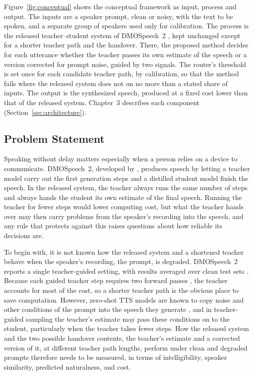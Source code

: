Figure~\ref{fig:conceptual} shows the conceptual framework as input, process and output. The inputs are a speaker prompt, clean or noisy, with the text to be spoken, and a separate group of speakers used only for calibration. The process is the released teacher--student system of DMOSpeech~2 \parencite{li2025dmospeech2}, kept unchanged except for a shorter teacher path and the handover. There, the proposed method decides for each utterance whether the teacher passes its own estimate of the speech or a version corrected for prompt noise, guided by two signals. The router's threshold is set once for each candidate teacher path, by calibration, so that the method fails where the released system does not on no more than a stated share of inputs. The output is the synthesized speech, produced at a fixed cost lower than that of the released system. Chapter~3 describes each component (Section~\ref{sec:architecture}).



\subsection{Problem Statement}
\label{sec:problem}

Speaking without delay matters especially when a person relies on a device to communicate. DMOSpeech~2, developed by \textcite{li2025dmospeech2}, produces speech by letting a teacher model carry out the first generation steps and a distilled student model finish the speech. In the released system, the teacher always runs the same number of steps and always hands the student its own estimate of the final speech. Running the teacher for fewer steps would lower computing cost, but what the teacher hands over may then carry problems from the speaker's recording into the speech, and any rule that protects against this raises questions about how reliable its decisions are.

To begin with, it is not known how the released system and a shortened teacher behave when the speaker's recording, the prompt, is degraded. DMOSpeech~2 reports a single teacher-guided setting, with results averaged over clean test sets \parencite[p.~31819]{li2025dmospeech2}. Because each guided teacher step requires two forward passes \parencite{ho2022cfg,yang2025shallow}, the teacher accounts for most of the cost, so a shorter teacher path is the obvious place to save computation. However, zero-shot TTS models are known to copy noise and other conditions of the prompt into the speech they generate \parencite{lu2026environment,wang2024noise}, and in teacher-guided sampling the teacher's estimate may pass these conditions on to the student, particularly when the teacher takes fewer steps. How the released system and the two possible handover contents, the teacher's estimate and a corrected version of it, at different teacher path lengths, perform under clean and degraded prompts therefore needs to be measured, in terms of intelligibility, speaker similarity, predicted naturalness, and cost.

